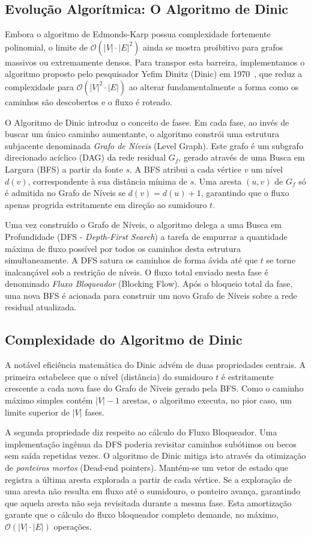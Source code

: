 \documentclass[12pt,a4paper]{article}
\begin{document}
\subsection{Evolução Algorítmica: O Algoritmo de Dinic}
Embora o algoritmo de Edmonds-Karp possua complexidade fortemente polinomial, o limite de $\mathcal{O}(|V| \cdot |E|^2)$ ainda se mostra proibitivo para grafos massivos ou extremamente densos. Para transpor esta barreira, implementamos o algoritmo proposto pelo pesquisador Yefim Dinitz (Dinic) em 1970~\cite{dinic1970algorithm}, que reduz a complexidade para $\mathcal{O}(|V|^2 \cdot |E|)$ ao alterar fundamentalmente a forma como os caminhos são descobertos e o fluxo é roteado.

O Algoritmo de Dinic introduz o conceito de fases. Em cada fase, ao invés de buscar um único caminho aumentante, o algoritmo constrói uma estrutura subjacente denominada \textit{Grafo de Níveis} (Level Graph). Este grafo é um subgrafo direcionado acíclico (DAG) da rede residual $G_f$, gerado através de uma Busca em Largura (BFS) a partir da fonte $s$. A BFS atribui a cada vértice $v$ um nível $d(v)$, correspondente à sua distância mínima de $s$. Uma aresta $(u,v)$ de $G_f$ só é admitida no Grafo de Níveis se $d(v) = d(u) + 1$, garantindo que o fluxo apenas progrida estritamente em direção ao sumidouro $t$.

Uma vez construído o Grafo de Níveis, o algoritmo delega a uma Busca em Profundidade (DFS - \textit{Depth-First Search}) a tarefa de empurrar a quantidade máxima de fluxo possível por todos os caminhos desta estrutura simultaneamente. A DFS satura os caminhos de forma ávida até que $t$ se torne inalcançável sob a restrição de níveis. O fluxo total enviado nesta fase é denominado \textit{Fluxo Bloqueador} (Blocking Flow). Após o bloqueio total da fase, uma nova BFS é acionada para construir um novo Grafo de Níveis sobre a rede residual atualizada.

\subsection{Complexidade do Algoritmo de Dinic}
A notável eficiência matemática do Dinic advém de duas propriedades centrais. A primeira estabelece que o nível (distância) do sumidouro $t$ é estritamente crescente a cada nova fase do Grafo de Níveis gerado pela BFS. Como o caminho máximo simples contém $|V|-1$ arestas, o algoritmo executa, no pior caso, um limite superior de $|V|$ fases.

A segunda propriedade diz respeito ao cálculo do Fluxo Bloqueador. Uma implementação ingênua da DFS poderia revisitar caminhos subótimos ou becos sem saída repetidas vezes. O algoritmo de Dinic mitiga isto através da otimização de \textit{ponteiros mortos} (Dead-end pointers). Mantém-se um vetor de estado que registra a última aresta explorada a partir de cada vértice. Se a exploração de uma aresta não resulta em fluxo até o sumidouro, o ponteiro avança, garantindo que aquela aresta não seja revisitada durante a mesma fase. Esta amortização garante que o cálculo do fluxo bloqueador completo demande, no máximo, $\mathcal{O}(|V| \cdot |E|)$ operações.
\end{document}
